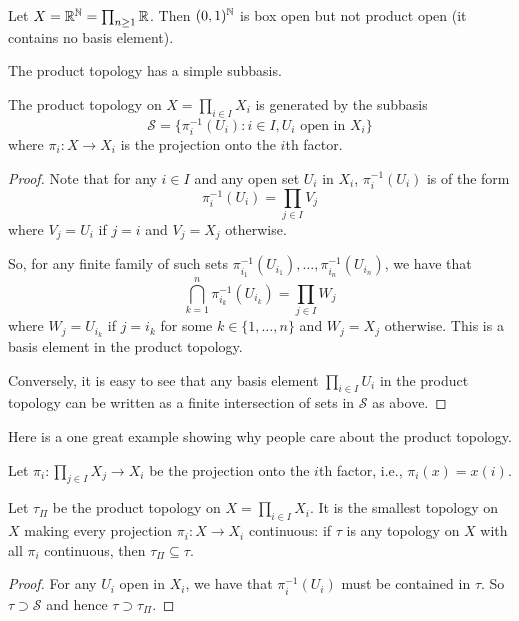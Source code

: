 \begin{example}
Let $X=\mathbb{R}^{\mathbb{N}}=\prod_{n\ge1}\mathbb{R}$. Then $(0,1)^{\mathbb{N}}$ is box open but not product open (it contains no basis element). 
\end{example}

The product topology has a simple subbasis.

\begin{theorem}
  The product topology on $X=\prod_{i\in I}X_i$ is generated by the subbasis
  \[
  \mathcal{S}=\{\pi_i^{-1}(U_i): i\in I, U_i\text{ open in } X_i\}
  \]
  where $\pi_i:X\to X_i$ is the projection onto the $i$th factor.
\end{theorem}
\begin{proof}
  Note that for any $i\in I$ and any open set $U_i$ in $X_i$, $\pi_i^{-1}(U_i)$ is of the form
  \[\pi_i^{-1}(U_i) = \prod_{j\in I} V_j\]
  where $V_j = U_i$ if $j=i$ and $V_j = X_j$ otherwise.

  So, for any finite family of such sets $\pi_{i_1}^{-1}(U_{i_1}),\ldots,\pi_{i_n}^{-1}(U_{i_n})$, we have that
  \[\bigcap_{k=1}^n \pi_{i_k}^{-1}(U_{i_k}) = \prod_{j\in I} W_j\]
  where $W_j = U_{i_k}$ if $j=i_k$ for some $k\in\{1,\ldots,n\}$ and $W_j = X_j$ otherwise. This is a basis element in the product topology.

  Conversely, it is easy to see that any basis element $\prod_{i\in I} U_i$ in the product topology can be written as a finite intersection of sets in $\mathcal{S}$ as above.
\end{proof}


Here is a one great example showing why people care about the product topology.

\begin{definition}
  Let $\pi_i:\prod_{j\in I} X_j\to X_i$ be the projection onto the $i$th factor, i.e., $\pi_i(x) = x(i)$. 
\end{definition}

\begin{theorem}[Minimality]
Let ${\tau}_{\Pi}$ be the product topology on $X=\prod_{i\in I}X_i$. It is the smallest topology on $X$ making every projection $\pi_i:X\to X_i$ continuous: if ${\tau}$ is any topology on $X$ with all $\pi_i$ continuous, then ${\tau}_{\Pi}\subseteq {\tau}$.
\end{theorem}

\begin{proof}
  For any $U_i$ open in $X_i$, we have that $\pi_i^{-1}(U_i)$ must be contained in $\tau$. So $\tau\supset \mathcal{S}$ and hence $\tau\supset \tau_\Pi$.
\end{proof}


